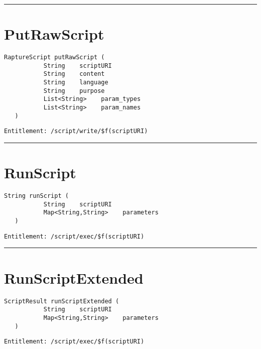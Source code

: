 \rule{12cm}{2pt}
\section{PutRawScript}
\label{Api:PutRawScript}
\begin{lstlisting}[style=nonumbers]
   RaptureScript putRawScript (
           String    scriptURI
           String    content
           String    language
           String    purpose
           List<String>    param_types
           List<String>    param_names
   )
\end{lstlisting}
\begin{Verbatim}[formatcom=\color{Maroon}]
  Entitlement: /script/write/$f(scriptURI)
\end{Verbatim}



\rule{12cm}{2pt}
\section{RunScript}
\label{Api:RunScript}
\begin{lstlisting}[style=nonumbers]
   String runScript (
           String    scriptURI
           Map<String,String>    parameters
   )
\end{lstlisting}
\begin{Verbatim}[formatcom=\color{Maroon}]
  Entitlement: /script/exec/$f(scriptURI)
\end{Verbatim}



\rule{12cm}{2pt}
\section{RunScriptExtended}
\label{Api:RunScriptExtended}
\begin{lstlisting}[style=nonumbers]
   ScriptResult runScriptExtended (
           String    scriptURI
           Map<String,String>    parameters
   )
\end{lstlisting}
\begin{Verbatim}[formatcom=\color{Maroon}]
  Entitlement: /script/exec/$f(scriptURI)
\end{Verbatim}



